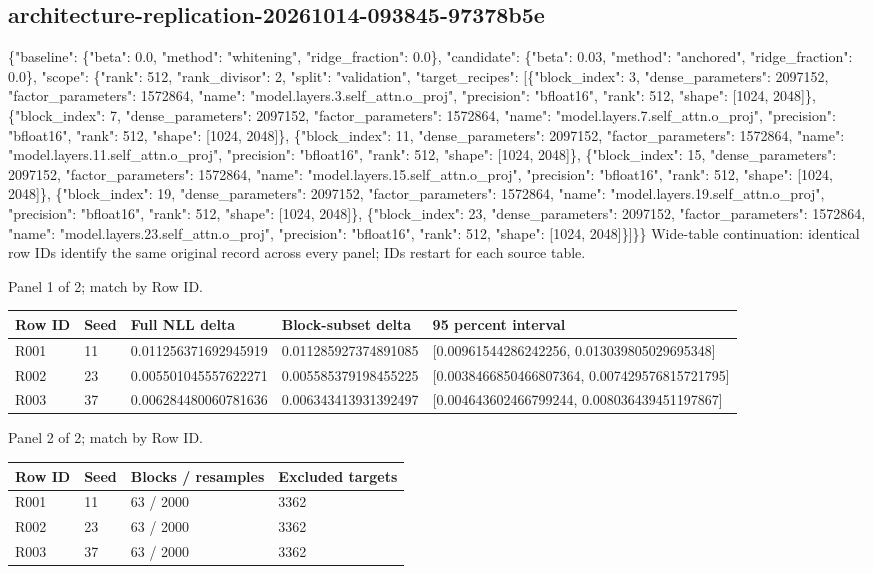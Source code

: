 \documentclass[10pt]{article}
\begin{document}
\subsection{architecture-replication-20261014-093845-97378b5e}
\{"baseline": \{"beta": 0.0, "method": "whitening", "ridge\_fraction": 0.0\}, "candidate": \{"beta": 0.03, "method": "anchored", "ridge\_fraction": 0.0\}, "scope": \{"rank": 512, "rank\_divisor": 2, "split": "validation", "target\_recipes": [\{"block\_index": 3, "dense\_parameters": 2097152, "factor\_parameters": 1572864, "name": "model.layers.3.self\_attn.o\_proj", "precision": "bfloat16", "rank": 512, "shape": [1024, 2048]\}, \{"block\_index": 7, "dense\_parameters": 2097152, "factor\_parameters": 1572864, "name": "model.layers.7.self\_attn.o\_proj", "precision": "bfloat16", "rank": 512, "shape": [1024, 2048]\}, \{"block\_index": 11, "dense\_parameters": 2097152, "factor\_parameters": 1572864, "name": "model.layers.11.self\_attn.o\_proj", "precision": "bfloat16", "rank": 512, "shape": [1024, 2048]\}, \{"block\_index": 15, "dense\_parameters": 2097152, "factor\_parameters": 1572864, "name": "model.layers.15.self\_attn.o\_proj", "precision": "bfloat16", "rank": 512, "shape": [1024, 2048]\}, \{"block\_index": 19, "dense\_parameters": 2097152, "factor\_parameters": 1572864, "name": "model.layers.19.self\_attn.o\_proj", "precision": "bfloat16", "rank": 512, "shape": [1024, 2048]\}, \{"block\_index": 23, "dense\_parameters": 2097152, "factor\_parameters": 1572864, "name": "model.layers.23.self\_attn.o\_proj", "precision": "bfloat16", "rank": 512, "shape": [1024, 2048]\}]\}\}
Wide-table continuation: identical row IDs identify the same original record across every panel; IDs restart for each source table.
\par\noindent Panel 1 of 2; match by Row ID.
{\scriptsize\setlength{\tabcolsep}{2pt}
\begin{longtable}{p{}p{}p{}p{}p{}}
Row ID & Seed & Full NLL delta & Block-subset delta & 95 percent interval \\
\hline\endhead
R001 & 11 & 0.011256371692945919 & 0.011285927374891085 & [0.00961544286242256, 0.013039805029695348] \\
R002 & 23 & 0.005501045557622271 & 0.005585379198455225 & [0.0038466850466807364, 0.007429576815721795] \\
R003 & 37 & 0.006284480060781636 & 0.006343413931392497 & [0.004643602466799244, 0.008036439451197867] \\
\end{longtable}}
\par\noindent Panel 2 of 2; match by Row ID.
{\scriptsize\setlength{\tabcolsep}{2pt}
\begin{longtable}{p{}p{}p{}p{}}
Row ID & Seed & Blocks / resamples & Excluded targets \\
\hline\endhead
R001 & 11 & 63 / 2000 & 3362 \\
R002 & 23 & 63 / 2000 & 3362 \\
R003 & 37 & 63 / 2000 & 3362 \\
\end{longtable}}
\end{document}
